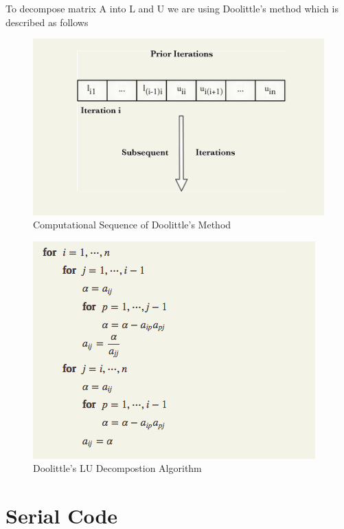 \documentclass{sem5}
\begin{document}
To decompose matrix A into L and U we are using Doolittle's method which is described as follows
\begin{figure}[htbp]
\centering
\includegraphics[scale=.5]{1.png}
\caption{Computational Sequence of Doolittle's Method}
\end{figure}
\begin{figure}
\centering
\includegraphics[scale=.5]{2.png}
\caption{Doolittle's LU Decompostion Algorithm}
\end{figure}
\newpage
\section{Serial Code}

\newpage
\end{document}

